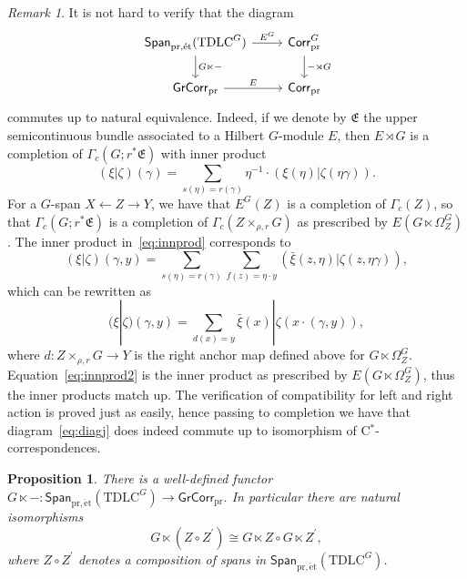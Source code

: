 \documentclass[a4paper,reqno]{amsart}
\theoremstyle{plain}
\newtheorem{proposition}[theorem]{Proposition}
\theoremstyle{definition}
\theoremstyle{remark}
\newtheorem{remark}[theorem]{Remark}
\numberwithin{equation}{section}
\newcommand{\Span}{\mathsf{Span}}
\newcommand{\PrCorr}{\mathsf{Corr}_{\mathrm{pr}}}
\newcommand{\PrGrCorr}{\mathsf{GrCorr}_{\mathrm{pr}}}
\newcommand{\pret}{\mathrm{pr,\acute{e}t}}
\newcommand{\TDLC}{\mathrm{TDLC}}
\begin{document}
\begin{remark}\label{rem:diagj}
It is not hard to verify that the diagram
\begin{equation}\label{eq:diagj}
\begin{tikzcd}
\Span_{\pret}(\TDLC^G) \arrow[r, "E^G"] \arrow[d, "G\ltimes -"] & \PrCorr^G \arrow[d, "- \rtimes G"] \\
\PrGrCorr \arrow[r, "E"]                 & \PrCorr               
\end{tikzcd}
\end{equation}
commutes up to natural equivalence.
Indeed, if we denote by $\mathfrak E$ the upper semicontinuous bundle associated to a Hilbert $G$-module $E$, then $E\rtimes G$ is a completion of $\Gamma_c(G;r^*\mathfrak{E})$ with inner product
\begin{equation}\label{eq:innprod}
(\xi|\zeta) (\gamma)= \sum_{s(\eta)=r(\gamma)} \eta^{-1}\cdot ({\xi}(\eta)|\zeta(\eta\gamma)).
\end{equation}
For a $G$-span $X \leftarrow Z \to Y$, we have that $E^G(Z)$ is a completion of $\Gamma_c(Z)$, so that $\Gamma_c(G;r^*\mathfrak{E})$ is a completion of $\Gamma_c(Z\times_{\rho,r} G)$ as prescribed by $E(G\ltimes \Omega^G_Z)$. The inner product in~\eqref{eq:innprod} corresponds to
\begin{equation*}%
(\xi|\zeta) (\gamma,y)= \sum_{s(\eta)=r(\gamma)} \sum_{f(z)=\eta\cdot y}(\bar{\xi}(z,\eta)|\zeta(z,\eta\gamma)),
\end{equation*}
which can be rewritten as 
\begin{equation}\label{eq:innprod2}
(\xi|\zeta) (\gamma,y)= \sum_{d(x)=y} \bar{\xi}(x)|\zeta(x\cdot (\gamma,y)),
\end{equation}
where $d\colon Z\times_{\rho,r} G\to Y$ is the right anchor map defined above for $G\ltimes \Omega^G_Z$.
Equation~\eqref{eq:innprod2} is the inner product as prescribed by $E(G\ltimes \Omega^G_Z)$, thus the inner products match up. The verification of compatibility for left and right action is proved just as easily, hence passing to completion we have that diagram~\eqref{eq:diagj} does indeed commute up to isomorphism of C$^*$-correspondences.
\end{remark}

\begin{proposition}
There is a well-defined functor $G\ltimes -\colon \Span_{\pret}(\TDLC^G)\to \PrGrCorr$. In particular there are natural isomorphisms 
\[
G\ltimes (Z\circ Z^\prime)\cong G\ltimes Z \circ G\ltimes Z^\prime,
\]
where $Z\circ Z^\prime$ denotes a composition of spans in $\Span_{\pret}(\TDLC^G)$.
\end{proposition}
\end{document}
